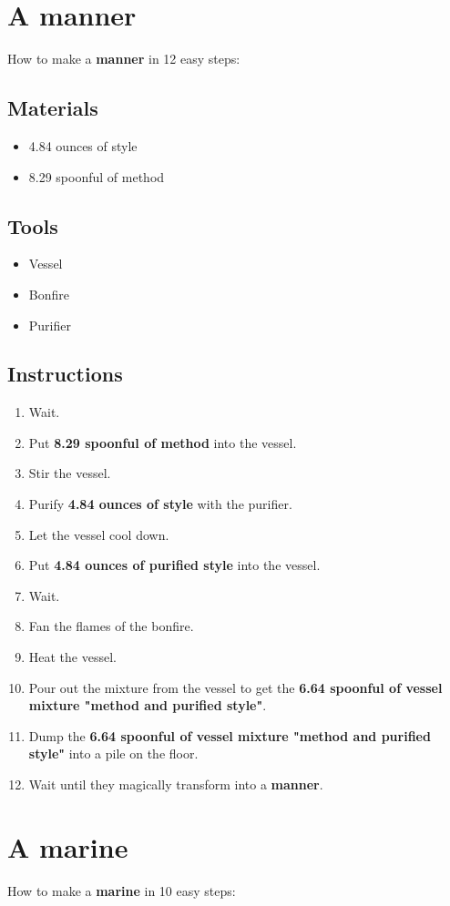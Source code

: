 \documentclass{article}
\begin{document}
\section{A manner}How to make a \textbf{manner} in 12 easy steps:

\subsection{Materials}\begin{itemize}
\item 
4.84 ounces of style
\item 
8.29 spoonful of method
\end{itemize}
\subsection{Tools}\begin{itemize}
\item 
Vessel
\item 
Bonfire
\item 
Purifier
\end{itemize}
\subsection{Instructions}\begin{enumerate}
\item 
Wait.
\item 
Put \textbf{8.29 spoonful of method} into the vessel.
\item 
Stir the vessel.
\item 
Purify \textbf{4.84 ounces of style} with the purifier.
\item 
Let the vessel cool down.
\item 
Put \textbf{4.84 ounces of purified style} into the vessel.
\item 
Wait.
\item 
Fan the flames of the bonfire.
\item 
Heat the vessel.
\item 
Pour out the mixture from the vessel to get the \textbf{6.64 spoonful of vessel mixture "method and purified style"}.
\item 
Dump the \textbf{6.64 spoonful of vessel mixture "method and purified style"} into a pile on the floor.
\item 
Wait until they magically transform into a \textbf{manner}.
\end{enumerate}
\newpage
\section{A marine}How to make a \textbf{marine} in 10 easy steps:
\end{document}
